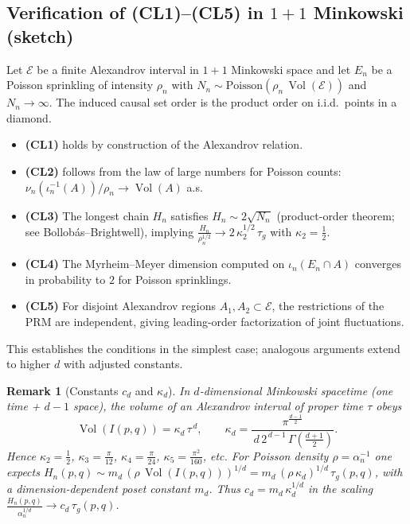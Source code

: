 \documentclass[12pt,a4paper]{article}
\newtheorem{remark}{Remark}
\DeclareMathOperator{\Vol}{Vol}
\begin{document}


\subsection{Verification of \textnormal{(CL1)--(CL5)} in $1{+}1$ Minkowski (sketch)}\label{subsec:cl_check_1p1}
Let $\mathcal{E}$ be a finite Alexandrov interval in $1{+}1$ Minkowski space and let $E_n$ be a Poisson sprinkling of intensity $\rho_n$ with $N_n\sim\mathrm{Poisson}(\rho_n\,\Vol(\mathcal{E}))$ and $N_n\to\infty$. The induced causal set order is the product order on i.i.d.\ points in a diamond.
\begin{itemize}
  \item \textbf{(CL1)} holds by construction of the Alexandrov relation.
  \item \textbf{(CL2)} follows from the law of large numbers for Poisson counts: $\nu_n(\iota_n^{-1}(A))/\rho_n\to \Vol(A)$ a.s.
  \item \textbf{(CL3)} The longest chain $H_n$ satisfies $H_n \sim 2\sqrt{N_n}$ (product-order theorem; see Bollob\'as--Brightwell), implying $\frac{H_n}{\rho_n^{1/2}}\to 2\,\kappa_2^{1/2}\,\tau_g$ with $\kappa_2=\tfrac12$.
  \item \textbf{(CL4)} The Myrheim--Meyer dimension computed on $\iota_n(E_n\cap A)$ converges in probability to $2$ for Poisson sprinklings.
  \item \textbf{(CL5)} For disjoint Alexandrov regions $A_1,A_2\subset \mathcal{E}$, the restrictions of the PRM are independent, giving leading-order factorization of joint fluctuations.
\end{itemize}
This establishes the conditions in the simplest case; analogous arguments extend to higher $d$ with adjusted constants.


\begin{remark}[Constants $c_d$ and $\kappa_d$]\label{rem:constants}
In $d$-dimensional Minkowski spacetime (one time + $d-1$ space), the volume of an Alexandrov interval of proper time $\tau$ obeys
\[\Vol(I(p,q))=\kappa_d\,\tau^{\,d},\qquad \kappa_d=\frac{\pi^{\frac{d-1}{2}}}{\,d\, 2^{\,d-1}\, \Gamma\!\left(\frac{d+1}{2}\right)}.\]
Hence $\kappa_2=\tfrac12$, $\kappa_3=\tfrac{\pi}{12}$, $\kappa_4=\tfrac{\pi}{24}$, $\kappa_5=\tfrac{\pi^2}{160}$, etc.
For Poisson density $\rho=\alpha_n^{-1}$ one expects
$H_n(p,q)\sim m_d\,(\rho\,\Vol(I(p,q)))^{1/d}=m_d\,(\rho\,\kappa_d)^{1/d}\,\tau_g(p,q)$,
with a dimension-dependent poset constant $m_d$. Thus $c_d=m_d\,\kappa_d^{1/d}$ in the scaling $\frac{H_n(p,q)}{\alpha_n^{1/d}}\to c_d\,\tau_g(p,q)$.
\end{remark}
\end{document}
